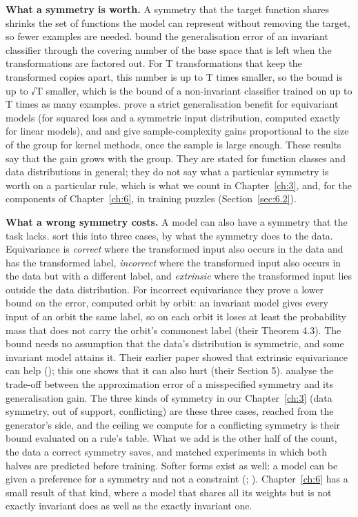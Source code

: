 \textbf{What a symmetry is worth.} A symmetry that the target function shares shrinks the set of functions the model can represent without removing the target, so fewer examples are needed. \citet{sokolic2017generalization} bound the generalisation error of an invariant classifier through the covering number of the base space that is left when the transformations are factored out. For T transformations that keep the transformed copies apart, this number is up to T times smaller, so the bound is up to √T smaller, which is the bound of a non-invariant classifier trained on up to T times as many examples. \citet{elesedy2021provably} prove a strict generalisation benefit for equivariant models (for squared loss and a symmetric input distribution, computed exactly for linear models), and \citet{bietti2021sample} and \citet{tahmasebi2023exact} give sample-complexity gains proportional to the size of the group for kernel methods, once the sample is large enough. These results say that the gain grows with the group. They are stated for function classes and data distributions in general; they do not say what a particular symmetry is worth on a particular rule, which is what we count in Chapter~\ref{ch:3}, and, for the components of Chapter~\ref{ch:6}, in training puzzles (Section~\ref{sec:6.2}).

\textbf{What a wrong symmetry costs.} A model can also have a symmetry that the task lacks. \citet{wang2023general} sort this into three cases, by what the symmetry does to the data. Equivariance is \emph{correct} where the transformed input also occurs in the data and has the transformed label, \emph{incorrect} where the transformed input also occurs in the data but with a different label, and \emph{extrinsic} where the transformed input lies outside the data distribution. For incorrect equivariance they prove a lower bound on the error, computed orbit by orbit: an invariant model gives every input of an orbit the same label, so on each orbit it loses at least the probability mass that does not carry the orbit's commonest label (their Theorem 4.3). The bound needs no assumption that the data's distribution is symmetric, and some invariant model attains it. Their earlier paper showed that extrinsic equivariance can help (\citealp{wang2023surprising}); this one shows that it can also hurt (their Section 5). \citet{petrache2023approximation} analyse the trade-off between the approximation error of a misspecified symmetry and its generalisation gain. The three kinds of symmetry in our Chapter~\ref{ch:3} (data symmetry, out of support, conflicting) are these three cases, reached from the generator's side, and the ceiling we compute for a conflicting symmetry is their bound evaluated on a rule's table. What we add is the other half of the count, the data a correct symmetry saves, and matched experiments in which both halves are predicted before training. Softer forms exist as well: a model can be given a preference for a symmetry and not a constraint (\citealp{finzi2021residual}; \citealp{wang2022approximately}). Chapter~\ref{ch:6} has a small result of that kind, where a model that shares all its weights but is not exactly invariant does as well as the exactly invariant one.

